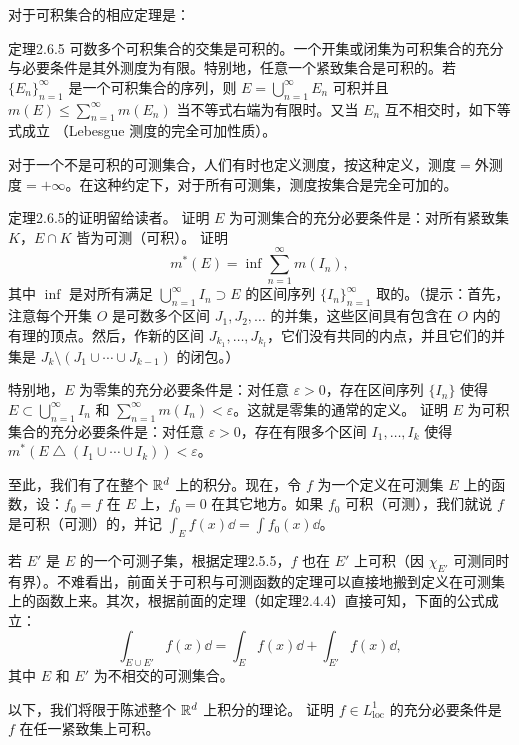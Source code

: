 对于可积集合的相应定理是：
\begin{statement}{定理}{2.6.5}
可数多个可积集合的交集是可积的。一个开集或闭集为可积集合的充分与必要条件是其外测度为有限。特别地，任意一个紧致集合是可积的。若 $\{E_n\}_{n=1}^\infty$ 是一个可积集合的序列，则 $E=\bigcup_{n=1}^\infty E_n$ 可积并且 $m(E)\le\sum_{n=1}^\infty m(E_n)$ 当不等式右端为有限时。又当 $E_n$ 互不相交时，如下等式成立
（Lebesgue 测度的完全可加性质）。
\end{statement}
对于一个不是可积的可测集合，人们有时也定义测度，按这种定义，测度$=$外测度$=+\infty$。在这种约定下，对于所有可测集，测度按集合是完全可加的。

定理2.6.5的证明留给读者。
\Exercise 证明 $E$ 为可测集合的充分必要条件是：对所有紧致集 $K$，$E\cap K$ 皆为可测（可积）。
\Exercise 证明
\[m^*(E)=\inf\sum_{n=1}^\infty m(I_n),\]
其中 $\inf$ 是对所有满足 $\bigcup_{n=1}^\infty I_n\supset E$ 的区间序列 $\{I_n\}_{n=1}^\infty$ 取的。（提示：首先，注意每个开集 $O$ 是可数多个区间 $J_1,J_2,\ldots$ 的并集，这些区间具有包含在 $O$ 内的有理的顶点。然后，作新的区间 $J_{k_1},\ldots,J_{k_l}$，它们没有共同的内点，并且它们的并集是 $J_k\setminus(J_1\cup\cdots\cup J_{k-1})$ 的闭包。）

特别地，$E$ 为零集的充分必要条件是：对任意 $\varepsilon>0$，存在区间序列 $\{I_n\}$ 使得 $E\subset\bigcup_{n=1}^\infty I_n$ 和 $\sum_{n=1}^\infty m(I_n)<\varepsilon$。这就是零集的通常的定义。
\Exercise 证明 $E$ 为可积集合的充分必要条件是：对任意 $\varepsilon>0$，存在有限多个区间 $I_1,\ldots,I_k$ 使得 $m^*(E\mathbin\triangle(I_1\cup\cdots\cup I_k))<\varepsilon$。

至此，我们有了在整个 $\mathbb R^d$ 上的积分。现在，令 $f$ 为一个定义在可测集 $E$ 上的函数，设：$f_0=f$ 在 $E$ 上，$f_0=0$ 在其它地方。如果 $f_0$ 可积（可测），我们就说 $f$ 是可积（可测）的，并记 $\int_E f(x)\dd=\int f_0(x)\dd$。

若 $E'$ 是 $E$ 的一个可测子集，根据定理2.5.5，$f$ 也在 $E'$ 上可积（因 $\chi_{E'}$ 可测同时有界）。不难看出，前面关于可积与可测函数的定理可以直接地搬到定义在可测集上的函数上来。其次，根据前面的定理（如定理2.4.4）直接可知，下面的公式成立：
\[\int_{E\cup E'}f(x)\dd=\int_E f(x)\dd+\int_{E'}f(x)\dd,\]
其中 $E$ 和 $E'$ 为不相交的可测集合。

以下，我们将限于陈述整个 $\mathbb R^d$ 上积分的理论。
\Exercise 证明 $f\in L^1_{\mathrm{loc}}$ 的充分必要条件是 $f$ 在任一紧致集上可积。

